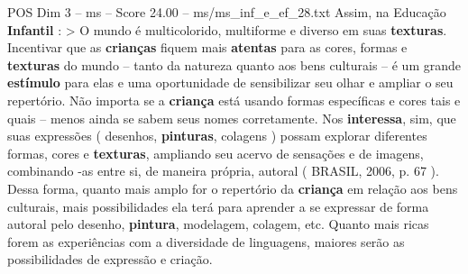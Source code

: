 \begin{textsample}{POS Dim 3 – ms – Score 24.00 – ms/ms\_inf\_e\_ef\_28.txt}
Assim, na Educação \textbf{Infantil} : > O mundo é multicolorido, multiforme e diverso em suas \textbf{texturas}.
Incentivar que as \textbf{crianças} fiquem mais \textbf{atentas} para as cores, formas e \textbf{texturas} do mundo – tanto da natureza quanto aos bens culturais – é um grande \textbf{estímulo} para elas e uma oportunidade de sensibilizar seu olhar e ampliar o seu repertório.
Não importa se a \textbf{criança} está usando formas específicas e cores tais e quais – menos ainda se sabem seus nomes corretamente.
Nos \textbf{interessa}, sim, que suas expressões ( desenhos, \textbf{pinturas}, colagens ) possam explorar diferentes formas, cores e \textbf{texturas}, ampliando seu acervo de sensações e de imagens, combinando -as entre si, de maneira própria, autoral ( BRASIL, 2006, p. 67 ).
Dessa forma, quanto mais amplo for o repertório da \textbf{criança} em relação aos bens culturais, mais possibilidades ela terá para aprender a se expressar de forma autoral pelo desenho, \textbf{pintura}, modelagem, colagem, etc.
Quanto mais ricas forem as experiências com a diversidade de linguagens, maiores serão as possibilidades de expressão e criação.

\end{textsample}
